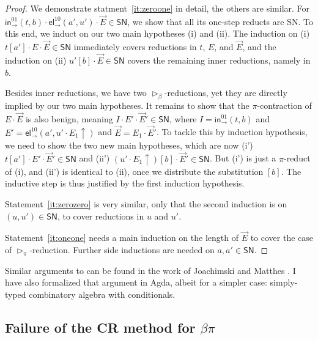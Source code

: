 \documentclass[a4paper,USenglish,cleveref, autoref, thm-restate]{lipics-v2019}
\newcommand{\tin}{\ensuremath{\mathsf{in}}}
\newcommand{\inn}[2]{\ensuremath{\tin_{#1}^{#2}}}
\newcommand{\tel}{\mathsf{el}}
\newcommand{\el}[2]{\ensuremath{\tel_{#1}^{#2}}}
\newcommand{\whd}[1][]{\rhd_{#1}}
\newcommand{\SN}{\mathsf{SN}}
\begin{document}
\begin{proof}
  We demonstrate statment~\ref{it:zeroone} in detail, the others are similar.
  For $\inn\to{01}(t,b) \cdot \el\to{10}(a',u') \cdot \vec E \in \SN$,
  we show that all its one-step reducts are SN.
  To this end, we induct on
  our two main hypotheses (i) and (ii).
  The induction on (i)
  $t[a'] \cdot E \cdot \vec E \in \SN$ immediately covers
  reductions in $t$, $E$, and $\vec E$,
  and the induction on (ii)
  $u'[b] \cdot \vec E \in \SN$ covers the remaining inner
  reductions, namely in $b$.

  Besides inner reductions, we have two $\whd[\beta]$-reductions, yet they
  are directly implied by our two main hypotheses.  It remains to show that the
  $\pi$-contraction of $E \cdot \vec E$ is also benign, meaning $I \cdot
  E' \cdot \vec E' \in \SN$,
  where $I = \inn\to{01}(t,b)$ and
  $E' = \el\to{10}(a', u' \cdot E_1\uparrow)$ and
  $\vec E = E_1 \cdot \vec E'$.
  To tackle this by induction hypothesis, we
  need to show the two new main hypotheses, which are now
  (i') $t[a'] \cdot E' \cdot \vec E' \in \SN$ and
  (ii') $(u' \cdot E_1\uparrow)[b] \cdot \vec E' \in \SN$.
  But (i') is just a $\pi$-reduct of (i), and (ii') is identical to
  (ii), once we distribute the substitution $[b]$.
  The inductive step is thus justified by the first induction
  hypothesis.

  Statement~\ref{it:zerozero} is very similar, only that the second
  induction is on $(u,u') \in \SN$, to cover reductions in $u$ and
  $u'$.

  Statement~\ref{it:oneone} needs a main induction on the length of
  $\vec E$ to cover the case of $\whd[\pi]$-reduction.  Further side
  inductions are needed on $a,a' \in \SN$.
\end{proof}
Similar arguments to  can be found in the work of
Joachimski and Matthes \cite[Sect.~5 and 6]{matthes:shortproofs}.
I have also formalized that argument in Agda, albeit for a simpler
case: simply-typed combinatory algebra with conditionals.

\subsection{Failure of the CR method for $\beta\pi$}
\end{document}
